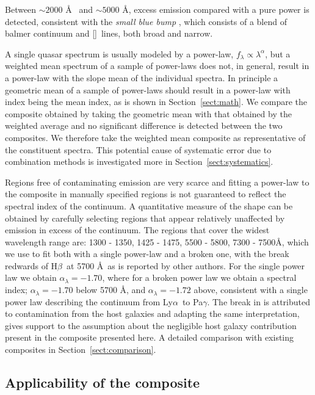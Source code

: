 \documentclass{aa}    %
\newcommand{\sectionname}{Section}
\newcommand{\Sect}[1]{\sectionname~\ref{sect:#1}}
\newcommand{\sect}[1]{\Sect{#1}}
\newcommand{\sectlabel}[1]{\label{sect:#1}}
\newcommand{\lya}{Ly$\alpha$}
\newcommand{\hb}{H$\beta$}
\newcommand{\feii}{[\ion{Fe}{ii}]}
\begin{document}
 Between $\sim2000$ \AA~ and $\sim5000$ \AA, excess emission compared with a pure power is detected, consistent with  the \textit{small blue bump} \citep{Wills1985}, which consists of a blend of balmer continuum and \feii ~lines, both broad and narrow.

 A single quasar spectrum is usually modeled by a power-law, $f_{\lambda} \propto \lambda^\alpha$, but a weighted mean spectrum of a sample of power-laws does not, in general, result in a power-law with the slope mean of the individual spectra. In principle a geometric mean of a sample of power-laws should result in a power-law with index being the mean index, as is shown in \sect{math}. We compare the composite obtained by taking the geometric mean with that obtained by the weighted average and no significant difference is detected between the two composites. We therefore take the  weighted mean composite as representative of the constituent spectra. This potential cause of systematic error due to combination methods is investigated more in \sect{systematics}.

Regions free of contaminating emission are very scarce and fitting a power-law to the composite in manually specified regions is not guaranteed to reflect the spectral index of the continuum. A quantitative measure of the shape can be obtained by carefully selecting regions that appear relatively unaffected by emission in excess of the continuum. The regions that cover the widest wavelength range are: 1300 - 1350, 1425 - 1475, 5500 - 5800, 7300 - 7500\AA, which we use to fit both with a single power-law and a broken one, with the break redwards of \hb~at 5700 \AA~as is reported by other authors\citep{VandenBerk2001}. For the single power law we obtain $\alpha_\lambda = -1.70$, where for a broken power law we obtain a spectral index; $\alpha_\lambda = -1.70$ below 5700 \AA, and $\alpha_\lambda = -1.72$ above, consistent with a single power law describing the continuum from  \lya ~to Pa$\gamma$. The break in \cite{VandenBerk2001} is attributed to contamination from the host galaxies\citep{Glikman2006} and adapting the same interpretation, gives support to the assumption about the negligible host galaxy contribution present in the composite presented here. A detailed comparison with existing composites in \sect{comparison}.


\subsection{Applicability of the composite}  \sectlabel{application}
\end{document}
